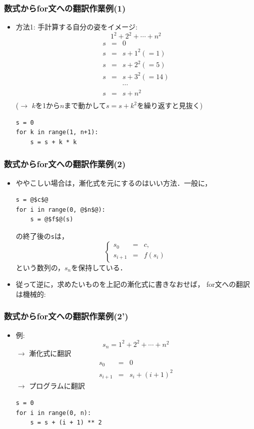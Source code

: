 \documentclass[10pt,dvipdfmx]{beamer}
\begin{document}
\begin{frame}[fragile]
\frametitle{数式からfor文への翻訳作業例(1)}
\begin{itemize}
\item 方法1: 手計算する自分の姿をイメージ: 
\[ 1^2 + 2^2 + \cdots + n^2 \]
\begin{eqnarray*}
s & = & 0 \\
s & = & s + 1^2 (= 1) \\
s & = & s + 2^2 (= 5) \\
s & = & s + 3^2 (= 14) \\
  &   &  \cdots  \\
s & = & s + n^2 \\
\end{eqnarray*}
($\rightarrow$ $k$を1から$n$まで動かして$s = s + k^2$を繰り返すと見抜く)
\begin{lstlisting}
s = 0
for k in range(1, n+1):
    s = s + k * k  
\end{lstlisting}
\end{itemize}
\end{frame}

\begin{frame}[fragile]
\frametitle{数式からfor文への翻訳作業例(2)}
\begin{itemize}
\item ややこしい場合は，漸化式を元にするのはいい方法．一般に，
\begin{lstlisting}
s = @$c$@
for i in range(0, @$n$@):
    s = @$f$@(s) 
\end{lstlisting}
の終了後の{\tt s}は，
\[
\left\{
\begin{array}{rcl}
s_0 & = & c,  \\
s_{i+1} & = & f(s_i)
\end{array}
\right.
\]
という数列の，$s_n$を保持している．

\item 従って逆に，求めたいものを上記の漸化式に書きなおせば，
for文への翻訳は機械的:
\end{itemize}
\end{frame}

\begin{frame}[fragile]
\frametitle{数式からfor文への翻訳作業例(2')}
\begin{itemize}
\item 例:
\[ s_n = 1^2 + 2^2 + \cdots + n^2 \]
$\rightarrow$ 漸化式に翻訳
\begin{eqnarray*}
s_0 & = & 0  \\
s_{i+1} & = & s_i + (i+1)^2 
\end{eqnarray*}
$\rightarrow$ プログラムに翻訳
\begin{lstlisting}
s = 0
for i in range(0, n):
    s = s + (i + 1) ** 2
\end{lstlisting}
\end{itemize}
\end{frame}
\end{document}
